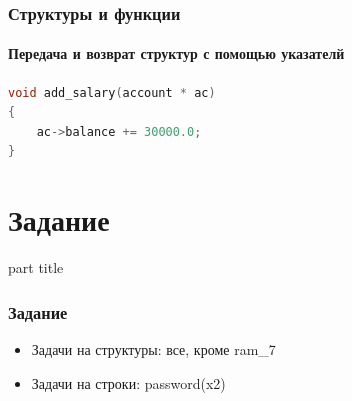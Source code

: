 \documentclass[14pt,pdf,hyperref={unicode}]{beamer}
\begin{document}
\begin{frame}[fragile]
\frametitle{Структуры и функции} 
\framesubtitle{Передача и возврат структур с помощью указателй} 

\begin{lstlisting}[language=C++,basicstyle=\ttfamily,keywordstyle=\color{blue}]
void add_salary(account * ac)
{
    ac->balance += 30000.0;
}
\end{lstlisting}
\end{frame}





\section{Задание}
\begin{frame}
\begin{center}
\begin{beamercolorbox}[sep=8pt,center]{part
title}
\insertsection
\end{beamercolorbox}
\end{center}
\end{frame}

\begin{frame}[fragile]
\frametitle{Задание} 
\begin{itemize}
\item Задачи на структуры: все, кроме ram\_7
\item Задачи на строки: password(x2)
\end{itemize}
\end{frame}
\end{document}
